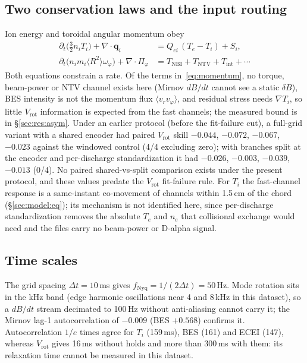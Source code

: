 \documentclass[10pt,twocolumn,letterpaper]{article}
\newcommand{\Ti}{\ensuremath{T_i}}
\newcommand{\Vrot}{\ensuremath{V_\mathrm{rot}}}
\begin{document}
\subsection{Two conservation laws and the input routing}
\label{sec:model:physics}
Ion energy and toroidal angular momentum obey
\begin{align}
  \partial_t\bigl(\tfrac{3}{2}n_i T_i\bigr) + \nabla\!\cdot\!\mathbf{q}_i
    &= Q_{ei}\,(T_e-T_i) + S_i,
  \label{eq:energy}\\
  \partial_t\bigl(n_i m_i \langle R^2\rangle \omega_\varphi\bigr)
    + \nabla\!\cdot\!\Pi_\varphi
    &= T_\mathrm{NBI} + T_\mathrm{NTV} + T_\mathrm{int} + \cdots
  \label{eq:momentum}
\end{align}
Both equations constrain a rate. Of the terms in~\eqref{eq:momentum}, no torque,
beam-power or NTV channel exists here (Mirnov $dB/dt$ cannot see a static $\delta B$),
BES intensity is not the momentum flux $\langle v_r v_\varphi\rangle$, and residual
stress needs $\nabla T_i$, so little \Vrot{} information is expected from the fast
channels; the measured bound is in \S\ref{sec:res:asym}. Under an earlier protocol
(before the fit-failure cut), a full-grid variant with a shared encoder had paired
\Vrot{} skill $-0.044$, $-0.072$, $-0.067$, $-0.023$ against the windowed control (4/4
excluding zero); with branches split at the encoder and per-discharge standardization it had $-0.026$, $-0.003$,
$-0.039$, $-0.013$ (0/4). No paired shared-vs-split comparison exists under the present
protocol, and these values predate the \Vrot{} fit-failure rule. For \Ti{} the
fast-channel response is a same-instant co-movement of channels within 1.5\,cm of the
chord (\S\ref{sec:model:eq}); its mechanism is not identified here, since
per-discharge standardization removes the absolute $T_e$ and $n_e$ that collisional
exchange would need and the files carry no beam-power or D-alpha signal.

\subsection{Time scales}
\label{sec:model:scales}
The grid spacing $\Delta t=10$\,ms gives $f_\mathrm{Nyq}=1/(2\Delta t)=50$\,Hz. Mode
rotation sits in the kHz band (edge harmonic oscillations near 4 and 8\,kHz in this
dataset), so a $dB/dt$ stream decimated to 100\,Hz without anti-aliasing cannot carry
it; the Mirnov lag-1 autocorrelation of $-0.009$ (BES $+0.568$) confirms it.
Autocorrelation $1/e$ times agree for \Ti{} (159\,ms), BES (161) and ECEI
(147), whereas \Vrot{} gives 16\,ms without holds and more than 300\,ms with them: its
relaxation time cannot be measured in this dataset.
\end{document}
